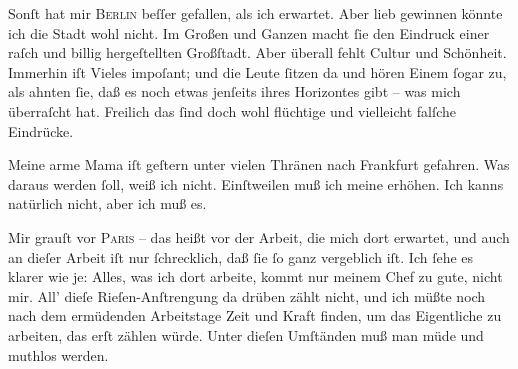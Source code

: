 \pstart
           Sonſt hat mir \textsc{Berlin} beſſer gefallen, als ich erwartet. Aber lieb {\pb}gewinnen könnte ich die Stadt
               wohl nicht. Im Großen und Ganzen macht{ }ſie den Eindruck\strikeout{\textcolor{gray}{,}} einer raſch und billig hergeſtellten Großſtadt. Aber überall fehlt Cultur und
               Schönheit. Immerhin iſt Vieles impoſant; und die Leute{ }ſitzen da und hören Einem ſogar zu, als ahnten{ }ſie, daß es noch etwas
               jenſeits ihres Horizontes gibt – was mich überraſcht hat. Freilich das{ }ſind {\pb}doch wohl flüchtige und vielleicht falſche
               Eindrücke.\pend
           
\pstart
           Meine arme Mama iſt geſtern unter vielen Thränen nach Frankfurt gefahren. Was daraus werden{ }ſoll, weiß ich nicht.
               Einſtweilen muß ich meine \label{K_L02784-12v}\label{K_L02784-12} erhöhen. Ich kanns natürlich nicht, aber ich muß es.\pend
           
\pstart
           Mir grauſt vor \textsc{Paris} – das heißt vor der Arbeit, die  mich {\pb}dort erwartet, und auch an dieſer Arbeit iſt nur{ }ſchrecklich, daß{ }ſie{ }ſo ganz vergeblich iſt. Ich{ }ſehe es \strikeout{\textcolor{gray}{×}\-\textcolor{gray}{×}} klarer wie je: Alles, was ich dort arbeite, kommt nur meinem Chef zu gute, nicht mir. All’ dieſe
               Rieſen-Anſtrengung da drüben zählt nicht, und ich müßte  noch nach dem ermüdenden Arbeitstage Zeit und Kraft finden, um das
               Eigentliche zu arbeiten, das erſt zählen würde. Unter {\pb}dieſen Umſtänden muß man müde und muthlos
               werden.\pend
           
